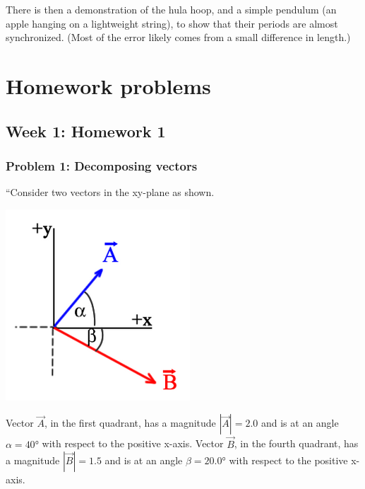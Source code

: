 \documentclass[12pt,a4paper]{report}
\begin{document}
There is then a demonstration of the hula hoop, and a simple pendulum (an apple hanging on a lightweight string), to show that their periods are almost synchronized. (Most of the error likely comes from a small difference in length.)




























\part{Homework problems}

\setcounter{chapter}{0}

\chapter{Week 1: Homework 1}

\section{Problem 1: Decomposing vectors}

``Consider two vectors in the xy-plane as shown.

\begin{center}
\includegraphics[scale=0.8]{Graphics/h1p1}
\end{center}

Vector $\vec{A}$, in the first quadrant, has a magnitude $|\vec{A}| = 2.0$ and is at an angle $\alpha = \ang{40}$ with respect to the positive x-axis. Vector $\vec{B}$, in the fourth quadrant, has a magnitude $|\vec{B}| = 1.5$ and is at an angle $\beta = \ang{20.0}$ with respect to the positive x-axis.
\end{document}
